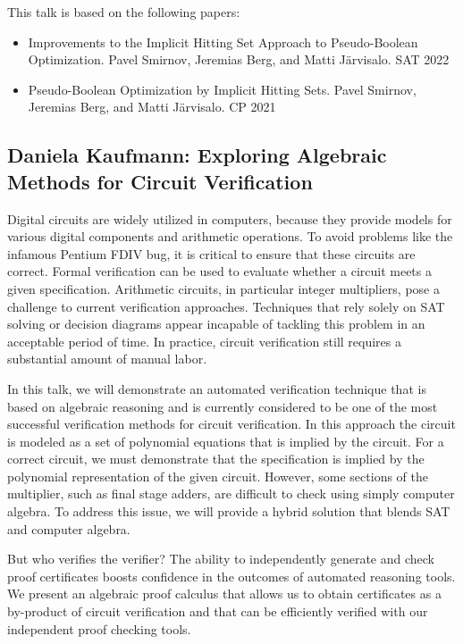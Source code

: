 \documentclass[11pt]{article}
\begin{document}
This talk is based on the following papers:
\begin{itemize}
  \item Improvements to the Implicit Hitting Set Approach to Pseudo-Boolean Optimization. Pavel Smirnov, Jeremias Berg, and Matti Järvisalo. SAT 2022
  \item Pseudo-Boolean Optimization by Implicit Hitting Sets. Pavel Smirnov, Jeremias Berg, and Matti Järvisalo. CP 2021
\end{itemize}


\subsection*{Daniela Kaufmann: Exploring Algebraic Methods for Circuit Verification}\label{Kaufmann}

Digital circuits are widely utilized in computers, because they provide models for various digital components and arithmetic operations. To avoid problems like the infamous Pentium FDIV bug, it is critical to ensure that these circuits are correct. Formal verification can be used to evaluate whether a circuit meets a given specification. Arithmetic circuits, in particular integer multipliers, pose a challenge to current verification approaches. Techniques that rely solely on SAT solving or decision diagrams appear incapable of tackling this problem in an acceptable period of time. In practice, circuit verification still requires a substantial amount of manual labor.

In this talk, we will demonstrate an automated verification technique that is based on algebraic reasoning and is currently considered to be one of the most successful verification methods for circuit verification. In this approach the circuit is modeled as a set of polynomial equations that is implied by the circuit. For a correct circuit, we must demonstrate that the specification is implied by the polynomial representation of the given circuit. However, some sections of the multiplier, such as final stage adders, are difficult to check using simply computer algebra. To address this issue, we will provide a hybrid solution that blends SAT and computer algebra.

But who verifies the verifier? The ability to independently generate and check proof certificates boosts confidence in the outcomes of automated reasoning tools. We present an algebraic proof calculus that allows us to obtain certificates as a by-product of circuit verification and that can be efficiently verified with our independent proof checking tools.
\end{document}
